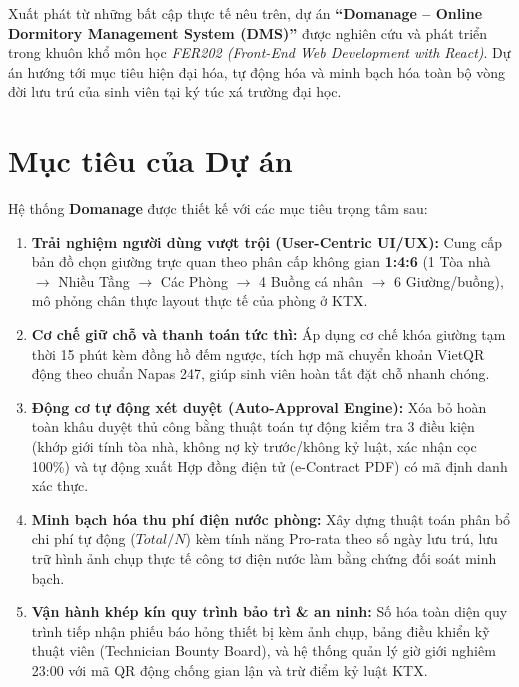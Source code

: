\documentclass[12pt,a4paper,oneside]{report}
\begin{document}
Xuất phát từ những bất cập thực tế nêu trên, dự án \textbf{``Domanage -- Online Dormitory Management System (DMS)''} được nghiên cứu và phát triển trong khuôn khổ môn học \textit{FER202 (Front-End Web Development with React)}. Dự án hướng tới mục tiêu hiện đại hóa, tự động hóa và minh bạch hóa toàn bộ vòng đời lưu trú của sinh viên tại ký túc xá trường đại học.

\section{Mục tiêu của Dự án}
Hệ thống \textbf{Domanage} được thiết kế với các mục tiêu trọng tâm sau:
\begin{enumerate}
    \item \textbf{Trải nghiệm người dùng vượt trội (User-Centric UI/UX):} Cung cấp bản đồ chọn giường trực quan theo phân cấp không gian \textbf{1:4:6} (1 Tòa nhà $\rightarrow$ Nhiều Tầng $\rightarrow$ Các Phòng $\rightarrow$ 4 Buồng cá nhân $\rightarrow$ 6 Giường/buồng), mô phỏng chân thực layout thực tế của phòng ở KTX.
    \item \textbf{Cơ chế giữ chỗ và thanh toán tức thì:} Áp dụng cơ chế khóa giường tạm thời 15 phút kèm đồng hồ đếm ngược, tích hợp mã chuyển khoản VietQR động theo chuẩn Napas 247, giúp sinh viên hoàn tất đặt chỗ nhanh chóng.
    \item \textbf{Động cơ tự động xét duyệt (Auto-Approval Engine):} Xóa bỏ hoàn toàn khâu duyệt thủ công bằng thuật toán tự động kiểm tra 3 điều kiện (khớp giới tính tòa nhà, không nợ kỳ trước/không kỷ luật, xác nhận cọc 100\%) và tự động xuất Hợp đồng điện tử (e-Contract PDF) có mã định danh xác thực.
    \item \textbf{Minh bạch hóa thu phí điện nước phòng:} Xây dựng thuật toán phân bổ chi phí tự động ($Total / N$) kèm tính năng Pro-rata theo số ngày lưu trú, lưu trữ hình ảnh chụp thực tế công tơ điện nước làm bằng chứng đối soát minh bạch.
    \item \textbf{Vận hành khép kín quy trình bảo trì \& an ninh:} Số hóa toàn diện quy trình tiếp nhận phiếu báo hỏng thiết bị kèm ảnh chụp, bảng điều khiển kỹ thuật viên (Technician Bounty Board), và hệ thống quản lý giờ giới nghiêm 23:00 với mã QR động chống gian lận và trừ điểm kỷ luật KTX.
\end{enumerate}
\end{document}
